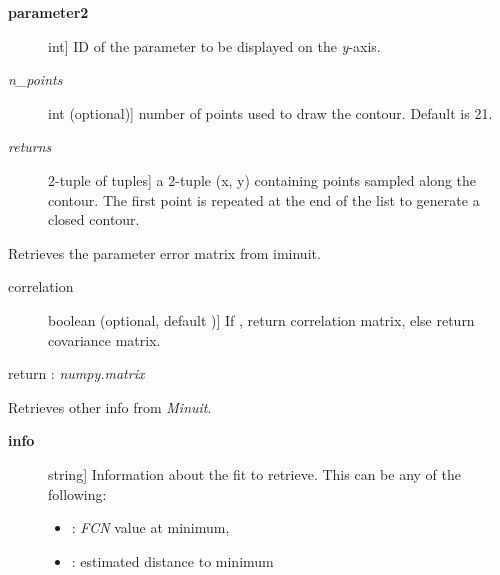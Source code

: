 \documentclass[a4paper,10pt,english]{sphinxmanual}
\begin{document}
\begin{fulllineitems}
\begin{fulllineitems}
\begin{description}
\item[{\textbf{parameter2}}] \leavevmode{[}int{]}
ID of the parameter to be displayed on the \emph{y}-axis.

\item[{\emph{n\_points}}] \leavevmode{[}int (optional){]}
number of points used to draw the contour. Default is 21.

\item[{\emph{returns}}] \leavevmode{[}2-tuple of tuples{]}
a 2-tuple (x, y) containing  points sampled
along the contour. The first point is repeated at the end
of the list to generate a closed contour.

\end{description}

\end{fulllineitems}


\begin{fulllineitems}
\label{module_doc:kafe.iminuit_wrapper.IMinuit.get_error_matrix}
Retrieves the parameter error matrix from iminuit.
\begin{description}
\item[{correlation}] \leavevmode{[}boolean (optional, default ){]}
If , return correlation matrix, else return
covariance matrix.

\end{description}

return : \emph{numpy.matrix}

\end{fulllineitems}


\begin{fulllineitems}
\label{module_doc:kafe.iminuit_wrapper.IMinuit.get_fit_info}
Retrieves other info from \emph{Minuit}.
\begin{description}
\item[{\textbf{info}}] \leavevmode{[}string{]}
Information about the fit to retrieve.
This can be any of the following:
\begin{itemize}
\item {} 
: \emph{FCN} value at minimum,

\item {} 
: estimated distance to minimum


\end{itemize}
\end{description}
\end{fulllineitems}
\end{fulllineitems}
\end{document}
